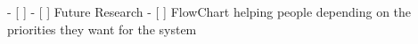 

- [ ]  
    - [ ]  Future Research
    - [ ]  FlowChart helping people depending on the priorities they want for the system